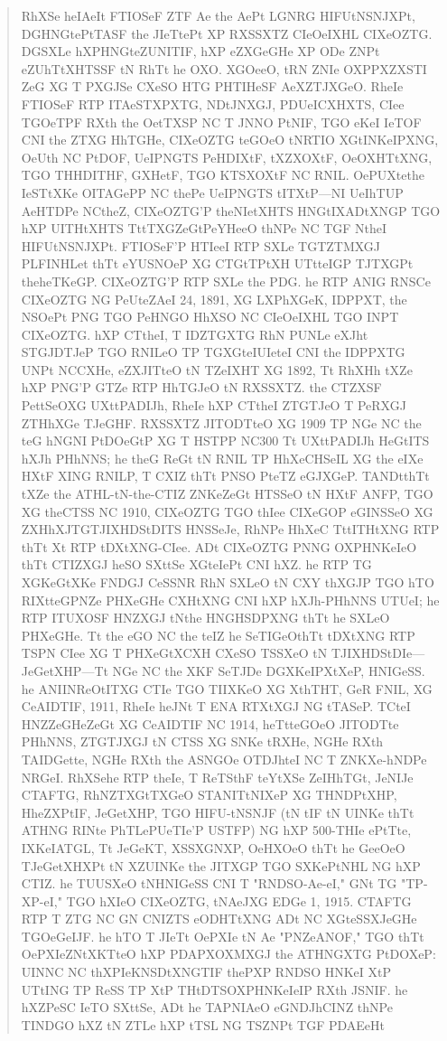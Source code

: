 \documentclass{labreport}
\begin{document}
\begin{quote}\footnotesize\ttfamily\raggedright
RhXSe heIAeIt FTIOSeF ZTF Ae the AePt LGNRG HIFUtNSNJXPt, DGHNGtePtTASF the JIeTtePt XP RXSSXTZ CIeOeIXHL CIXeOZTG. DGSXLe hXPHNGteZUNITIF, hXP eZXGeGHe XP ODe ZNPt eZUhTtXHTSSF tN RhTt he OXO. XGOeeO, tRN ZNIe OXPPXZXSTI ZeG XG T PXGJSe CXeSO HTG PHTIHeSF AeXZTJXGeO. RheIe FTIOSeF RTP ITAeSTXPXTG, NDtJNXGJ, PDUeICXHXTS, CIee TGOeTPF RXth the OetTXSP NC T JNNO PtNIF, TGO eKeI IeTOF CNI the ZTXG HhTGHe, CIXeOZTG teGOeO tNRTIO XGtINKeIPXNG, OeUth NC PtDOF, UeIPNGTS PeHDIXtF, tXZXOXtF, OeOXHTtXNG, TGO THHDITHF, GXHetF, TGO KTSXOXtF NC RNIL. OePUXtethe IeSTtXKe OITAGePP NC thePe UeIPNGTS tITXtP---NI UeIhTUP AeHTDPe NCtheZ, CIXeOZTG'P theNIetXHTS HNGtIXADtXNGP TGO hXP UITHtXHTS TttTXGZeGtPeYHeeO thNPe NC TGF NtheI HIFUtNSNJXPt. FTIOSeF'P HTIeeI RTP SXLe TGTZTMXGJ PLFINHLet thTt eYUSNOeP XG CTGtTPtXH UTtteIGP TJTXGPt theheTKeGP. CIXeOZTG'P RTP SXLe the PDG. he RTP ANIG RNSCe CIXeOZTG NG PeUteZAeI 24, 1891, XG LXPhXGeK, IDPPXT, the NSOePt PNG TGO PeHNGO HhXSO NC CIeOeIXHL TGO INPT CIXeOZTG. hXP CTtheI, T IDZTGXTG RhN PUNLe eXJht STGJDTJeP TGO RNILeO TP TGXGteIUIeteI CNI the IDPPXTG UNPt NCCXHe, eZXJITteO tN TZeIXHT XG 1892, Tt RhXHh tXZe hXP PNG'P GTZe RTP HhTGJeO tN RXSSXTZ. the CTZXSF PettSeOXG UXttPADIJh, RheIe hXP CTtheI ZTGTJeO T PeRXGJ ZTHhXGe TJeGHF. RXSSXTZ JITODTteO XG 1909 TP NGe NC the teG hNGNI PtDOeGtP XG T HSTPP NC300 Tt UXttPADIJh HeGtITS hXJh PHhNNS; he theG ReGt tN RNIL TP HhXeCHSeIL XG the eIXe HXtF XING RNILP, T CXIZ thTt PNSO PteTZ eGJXGeP. TANDtthTt tXZe the ATHL-tN-the-CTIZ ZNKeZeGt HTSSeO tN HXtF ANFP, TGO XG theCTSS NC 1910, CIXeOZTG TGO thIee CIXeGOP eGINSSeO XG ZXHhXJTGTJIXHDStDITS HNSSeJe, RhNPe HhXeC TttITHtXNG RTP thTt Xt RTP tDXtXNG-CIee. ADt CIXeOZTG PNNG OXPHNKeIeO thTt CTIZXGJ heSO SXttSe XGteIePt CNI hXZ. he RTP TG XGKeGtXKe FNDGJ CeSSNR RhN SXLeO tN CXY thXGJP TGO hTO RIXtteGPNZe PHXeGHe CXHtXNG CNI hXP hXJh-PHhNNS UTUeI; he RTP ITUXOSF HNZXGJ tNthe HNGHSDPXNG thTt he SXLeO PHXeGHe. Tt the eGO NC the teIZ he SeTIGeOthTt tDXtXNG RTP TSPN CIee XG T PHXeGtXCXH CXeSO TSSXeO tN TJIXHDStDIe---JeGetXHP---Tt NGe NC the XKF SeTJDe DGXKeIPXtXeP, HNIGeSS. he ANIINReOtITXG CTIe TGO TIIXKeO XG XthTHT, GeR FNIL, XG CeAIDTIF, 1911, RheIe heJNt T ENA RTXtXGJ NG tTASeP. TCteI HNZZeGHeZeGt XG CeAIDTIF NC 1914, heTtteGOeO JITODTte PHhNNS, ZTGTJXGJ tN CTSS XG SNKe tRXHe, NGHe RXth TAIDGette, NGHe RXth the ASNGOe OTDJhteI NC T ZNKXe-hNDPe NRGeI. RhXSehe RTP theIe, T ReTSthF teYtXSe ZeIHhTGt, JeNIJe CTAFTG, RhNZTXGtTXGeO STANITtNIXeP XG THNDPtXHP, HheZXPtIF, JeGetXHP, TGO HIFU-tNSNJF (tN tIF tN UINKe thTt ATHNG RINte PhTLePUeTIe'P USTFP) NG hXP 500-THIe ePtTte, IXKeIATGL, Tt JeGeKT, XSSXGNXP, OeHXOeO thTt he GeeOeO TJeGetXHXPt tN XZUINKe the JITXGP TGO SXKePtNHL NG hXP CTIZ. he TUUSXeO tNHNIGeSS CNI T "RNDSO-Ae-eI," GNt TG "TP-XP-eI," TGO hXIeO CIXeOZTG, tNAeJXG EDGe 1, 1915. CTAFTG RTP T ZTG NC GN CNIZTS eODHTtXNG ADt NC XGteSSXJeGHe TGOeGeIJF. he hTO T JIeTt OePXIe tN Ae "PNZeANOF," TGO thTt OePXIeZNtXKTteO hXP PDAPXOXMXGJ the ATHNGXTG PtDOXeP: UINNC NC thXPIeKNSDtXNGTIF thePXP RNDSO HNKeI XtP UTtING TP ReSS TP XtP THtDTSOXPHNKeIeIP RXth JSNIF. he hXZPeSC IeTO SXttSe, ADt he TAPNIAeO eGNDJhCINZ thNPe TINDGO hXZ tN ZTLe hXP tTSL NG TSZNPt TGF PDAEeHt 
\end{quote}
\end{document}
